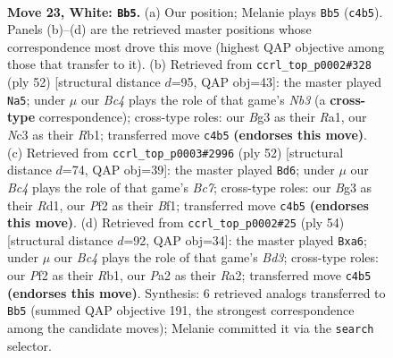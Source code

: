 \documentclass[11pt]{article}
\begin{document}
\clearpage

\begin{figure}[p]\centering
\begin{subfigure}{0.46\textwidth}\centering
\resizebox{\linewidth}{!}{%
\newchessgame
\chessboard[
  setfen={rnb3k1/5p2/1p2pn2/2b4p/2BrP3/2N3BP/PpR2PK1/1R2N3 w - - 2 23},
  showmover=false,
  pgfstyle=straightmove, color=movearrow, markmove={c4-b5}
]}
\caption{}
\end{subfigure}\hfill
\begin{subfigure}{0.46\textwidth}\centering
\resizebox{\linewidth}{!}{%
\newchessgame
\chessboard[
  setfen={1n1r2k1/p4pp1/p3b2p/2P1p3/4P3/1Nr1BP2/5KPP/RR6 w - - 0 27},
  showmover=false,
  pgfstyle=straightmove, color=movearrow, markmove={b3-a5}
]}
\caption{}
\end{subfigure}
\\[4pt]
\begin{subfigure}{0.46\textwidth}\centering
\resizebox{\linewidth}{!}{%
\newchessgame
\chessboard[
  setfen={r5k1/1rBn1p2/2b1p2p/p1p3pn/P3P3/2N2P2/6PP/R2R1BK1 w - - 2 27},
  showmover=false,
  pgfstyle=straightmove, color=movearrow, markmove={c7-d6}
]}
\caption{}
\end{subfigure}\hfill
\begin{subfigure}{0.46\textwidth}\centering
\resizebox{\linewidth}{!}{%
\newchessgame
\chessboard[
  setfen={4k1r1/b2b4/p2p4/4ppP1/P3P2B/2rBnP2/R2N2P1/1R5K w - - 0 28},
  showmover=false,
  pgfstyle=straightmove, color=movearrow, markmove={d3-a6}
]}
\caption{}
\end{subfigure}
\caption{\textbf{Move 23, White: \texttt{Bb5}.} (a) Our position; Melanie plays \texttt{Bb5} (\texttt{c4b5}). Panels (b)--(d) are the retrieved master positions whose correspondence most drove this move (highest QAP objective among those that transfer to it). (b) Retrieved from \texttt{ccrl\_top\_p0002\#328} (ply 52) [structural distance $d$=95, QAP obj=43]: the master played \texttt{Na5}; under $\mu$ our \emph{Bc4} plays the role of that game's \emph{Nb3} (a \textbf{cross-type} correspondence); cross-type roles: our \emph{B}g3 as their \emph{R}a1, our \emph{N}c3 as their \emph{R}b1; transferred move \texttt{c4b5} \textbf{(endorses this move)}. (c) Retrieved from \texttt{ccrl\_top\_p0003\#2996} (ply 52) [structural distance $d$=74, QAP obj=39]: the master played \texttt{Bd6}; under $\mu$ our \emph{Bc4} plays the role of that game's \emph{Bc7}; cross-type roles: our \emph{B}g3 as their \emph{R}d1, our \emph{P}f2 as their \emph{B}f1; transferred move \texttt{c4b5} \textbf{(endorses this move)}. (d) Retrieved from \texttt{ccrl\_top\_p0002\#25} (ply 54) [structural distance $d$=92, QAP obj=34]: the master played \texttt{Bxa6}; under $\mu$ our \emph{Bc4} plays the role of that game's \emph{Bd3}; cross-type roles: our \emph{P}f2 as their \emph{R}b1, our \emph{P}a2 as their \emph{R}a2; transferred move \texttt{c4b5} \textbf{(endorses this move)}. Synthesis: 6 retrieved analogs transferred to \texttt{Bb5} (summed QAP objective 191, the strongest correspondence among the candidate moves); Melanie committed it via the \texttt{search} selector.}
\label{fig:thought-m44}
\end{figure}
\end{document}

